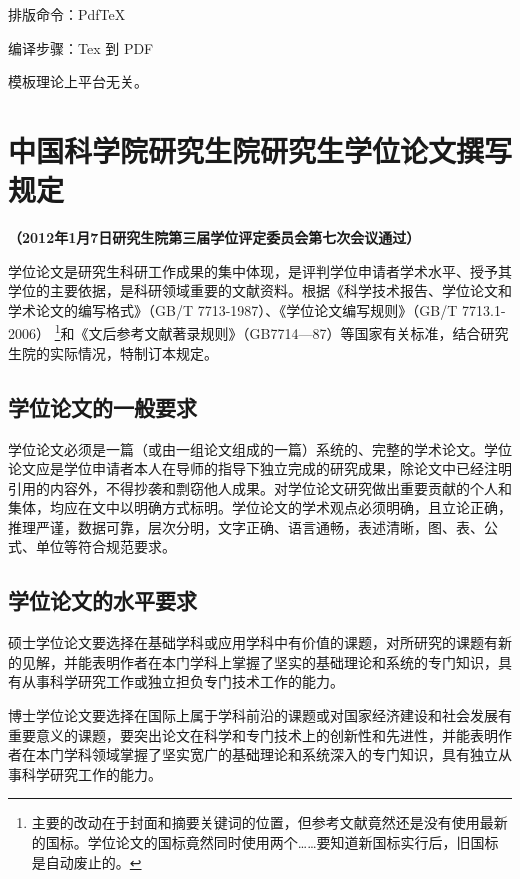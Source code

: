 \documentclass[a4paper,12pt,oneside,openany]{book}
\begin{document}
排版命令：PdfTeX

编译步骤：Tex 到 PDF

模板理论上平台无关。


\chapter{中国科学院研究生院研究生学位论文撰写规定 }

\begin{center}
\textbf{（2012年1月7日研究生院第三届学位评定委员会第七次会议通过）}
\par\end{center}

学位论文是研究生科研工作成果的集中体现，是评判学位申请者学术水平、授予其学位的主要依据，是科研领域重要的文献资料。根据《科学技术报告、学位论文和学术论文的编写格式》（GB/T
7713-1987）、《学位论文编写规则》（GB/T 7713.1-2006）\textbf{}%
\footnote{主要的改动在于封面和摘要关键词的位置，但参考文献竟然还是没有使用最新的国标。学位论文的国标竟然同时使用两个……要知道新国标实行后，旧国标是自动废止的。%
}和《文后参考文献著录规则》（GB7714—87）等国家有关标准，结合研究生院的实际情况，特制订本规定。


\section{学位论文的一般要求}

学位论文必须是一篇（或由一组论文组成的一篇）系统的、完整的学术论文。学位论文应是学位申请者本人在导师的指导下独立完成的研究成果，除论文中已经注明引用的内容外，不得抄袭和剽窃他人成果。对学位论文研究做出重要贡献的个人和集体，均应在文中以明确方式标明。学位论文的学术观点必须明确，且立论正确，推理严谨，数据可靠，层次分明，文字正确、语言通畅，表述清晰，图、表、公式、单位等符合规范要求。


\section{学位论文的水平要求}

硕士学位论文要选择在基础学科或应用学科中有价值的课题，对所研究的课题有新的见解，并能表明作者在本门学科上掌握了坚实的基础理论和系统的专门知识，具有从事科学研究工作或独立担负专门技术工作的能力。

博士学位论文要选择在国际上属于学科前沿的课题或对国家经济建设和社会发展有重要意义的课题，要突出论文在科学和专门技术上的创新性和先进性，并能表明作者在本门学科领域掌握了坚实宽广的基础理论和系统深入的专门知识，具有独立从事科学研究工作的能力。
\end{document}
